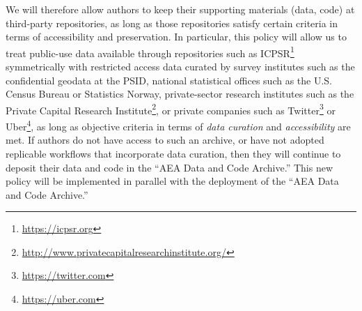 \documentclass[AEJ]{AEA}
\newcommand{\urlcite}[2]{#2\footnote{\url{#1}}}
\begin{document}
We will therefore allow authors to keep their supporting materials (data, code) at third-party repositories, as long as those repositories satisfy certain criteria in terms of accessibility and preservation. In particular, this policy will allow us to treat public-use data available through repositories such as \urlcite{https://icpsr.org}{ICPSR} symmetrically with restricted access data curated by survey institutes such as the confidential geodata at the \ac{PSID}, national statistical offices such as the U.S. Census Bureau or Statistics Norway, private-sector research institutes such as the \urlcite{http://www.privatecapitalresearchinstitute.org/}{Private Capital Research Institute}, or private companies such as \urlcite{https://twitter.com}{Twitter} or \urlcite{https://uber.com}{Uber}, as long as objective criteria in terms of \textit{data curation} and \textit{accessibility} are met. If authors do not have access to such an archive, or have not adopted replicable workflows that incorporate data curation, then they will continue to deposit their data and code in the ``AEA Data and Code Archive.'' This new policy will be implemented in parallel with the deployment of the ``AEA Data and Code Archive.''
\end{document}
